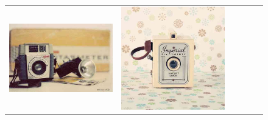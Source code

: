 \begin{figure}
\begin{tabular}{m{.01\linewidth} m{.16\linewidth} m{.16\linewidth} m{.16\linewidth} m{.16\linewidth} m{.16\linewidth}}
    \includegraphics[width=\linewidth]{../style/figures/flickr_on_flickr/pred_style_Vintage/1.jpg} &
    \includegraphics[width=\linewidth]{../style/figures/flickr_on_flickr/pred_style_Vintage/2.jpg} &

\end{tabular}
\end{figure}

